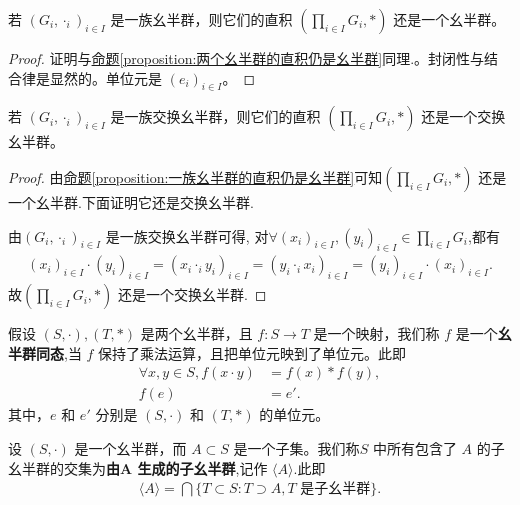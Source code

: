 \documentclass[../../main.tex]{subfiles}
\begin{document}
\begin{proposition}[一族幺半群的直积仍是幺半群]\label{proposition:一族幺半群的直积仍是幺半群}
若 $(G_i,\cdot_i)_{i\in I}$ 是一族幺半群，则它们的直积 $(\prod_{i\in I}G_i,*)$ 还是一个幺半群。  
\end{proposition}
\begin{proof}
证明与\hyperref[proposition:两个幺半群的直积仍是幺半群]{命题\ref{proposition:两个幺半群的直积仍是幺半群}}同理.。封闭性与结合律是显然的。单位元是 $(e_i)_{i\in I}$。 

\end{proof}

\begin{proposition}[一族交换幺半群的直积仍是交换幺半群]\label{proposition:一族交换幺半群的直积仍是交换幺半群}
若 $(G_i,\cdot_i)_{i\in I}$ 是一族交换幺半群，则它们的直积 $(\prod_{i\in I}G_i,*)$ 还是一个交换幺半群。  
\end{proposition}
\begin{proof}
由\hyperref[proposition:一族幺半群的直积仍是幺半群]{命题\ref{proposition:一族幺半群的直积仍是幺半群}}可知$(\prod_{i\in I}G_i,*)$ 还是一个幺半群.下面证明它还是交换幺半群.

由$(G_i,\cdot_i)_{i\in I}$ 是一族交换幺半群可得,
对$\forall (x_i)_{i\in I},(y_i)_{i\in I} \in \prod_{i\in I}G_i$,都有
\begin{align*}
\left( x_i \right) _{i\in I}\cdot \left( y_i \right) _{i\in I}=\left( x_i\cdot _iy_i \right) _{i\in I}=\left( y_i\cdot _ix_i \right) _{i\in I}=\left( y_i \right) _{i\in I}\cdot \left( x_i \right) _{i\in I}.
\end{align*}
故$(\prod_{i\in I}G_i,*)$ 还是一个交换幺半群.

\end{proof}

\begin{definition}[幺半群同态]
假设 $(S, \cdot), (T, *)$ 是两个幺半群，且 $f : S \to T$ 是一个映射，我们称 $f$ 是一个\textbf{幺半群同态},当 $f$ 保持了乘法运算，且把单位元映到了单位元。此即
\begin{align*}
\forall x, y \in S, f(x \cdot y) &= f(x) * f(y) ,\\
f(e) &= e'.
\end{align*}
其中，$e$ 和 $e'$ 分别是 $(S, \cdot)$ 和 $(T, *)$ 的单位元。 
\end{definition}

\begin{definition}[由子集生成的子幺半群]
设 $(S, \cdot)$ 是一个幺半群，而 $A \subset S$ 是一个子集。我们称$S$ 中所有包含了 $A$ 的子幺半群的交集为\textbf{由$\boldsymbol{A}$ 生成的子幺半群},记作 $\langle A \rangle$.此即
\begin{align*}
\langle A \rangle = \bigcap \{T \subset S : T \supset A, T \text{ 是子幺半群}\}.
\end{align*} 
\end{definition}
\end{document}
